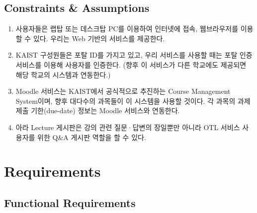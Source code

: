 \documentclass[a4paper,titlepage]{article}
\begin{document}
\subsection{Constraints \& Assumptions}

\begin{enumerate}
	\item 사용자들은 랩탑 또는 데스크탑 PC를 이용하여 인터넷에 접속, 웹브라우저를 이용할 수 있다.
	우리는 Web 기반의 서비스를 제공한다.

	\item KAIST 구성원들은 포탈 ID를 가지고 있고, 우리 서비스를 사용할 때는 포탈 인증 서비스를 이용해 사용자를 인증한다.
	(향후 이 서비스가 다른 학교에도 제공되면 해당 학교의 시스템과 연동한다.)

	\item Moodle 서비스는 KAIST에서 공식적으로 추진하는 Course Management System이며, 향후 대다수의 과목들이 이 시스템을 사용할 것이다.
	각 과목의 과제 제출 기한(due-date) 정보는 Moodle 서비스와 연동한다.

	\item 아라 Lecture 게시판은 강의 관련 질문·답변의 장일뿐만 아니라 OTL 서비스 사용자를 위한 Q\&A 게시판 역할을 할 수 있다.

\end{enumerate}

\pagebreak
\section{Requirements}
\subsection{Functional Requirements}
\end{document}
